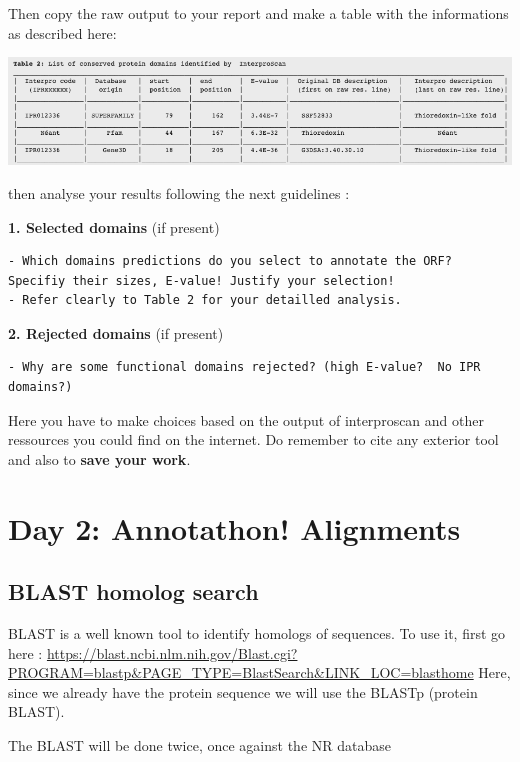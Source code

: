 \documentclass[
]{book}
\begin{document}
Then copy the raw output to your report and make a table with the informations as described here:

\includegraphics{figures/Annotathon/Annot_table2_prot_domain.png}

then analyse your results following the next guidelines :

\textbf{1. Selected domains} (if present)

\begin{verbatim}
- Which domains predictions do you select to annotate the ORF? Specifiy their sizes, E-value! Justify your selection!
- Refer clearly to Table 2 for your detailled analysis.
\end{verbatim}

\textbf{2. Rejected domains} (if present)

\begin{verbatim}
- Why are some functional domains rejected? (high E-value?  No IPR domains?)
\end{verbatim}

Here you have to make choices based on the output of interproscan and other ressources you could find on the internet. Do remember to cite any exterior tool and also to \textbf{save your work}.

\hypertarget{day-2-annotathon-alignments}{%
\section{Day 2: Annotathon! Alignments}\label{day-2-annotathon-alignments}}

\hypertarget{blast-homolog-search}{%
\subsection{BLAST homolog search}\label{blast-homolog-search}}

BLAST is a well known tool to identify homologs of sequences. To use it, first go here :
\url{https://blast.ncbi.nlm.nih.gov/Blast.cgi?PROGRAM=blastp\&PAGE_TYPE=BlastSearch\&LINK_LOC=blasthome}
Here, since we already have the protein sequence we will use the BLASTp (protein BLAST).

The BLAST will be done twice, once against the NR database
\end{document}
